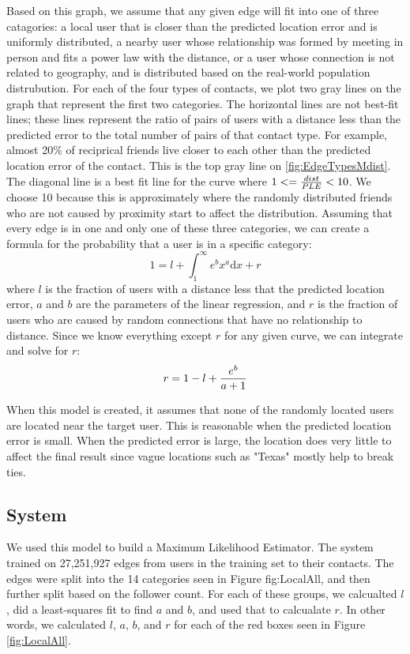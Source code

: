 \documentclass{sig-alternate}
\begin{document}
Based on this graph, we assume that any given edge will fit into one of three catagories: a local user that is closer than the predicted location error and is uniformly distributed, a nearby user whose relationship was formed by meeting in person and fits a power law with the distance, or a user whose connection is not related to geography, and is distributed based on the real-world population distrubution.
For each of the four types of contacts, we plot two gray lines on the graph that represent the first two categories.
The horizontal lines are not best-fit lines; these lines represent the ratio of pairs of users with a distance less than the predicted error to the total number of pairs of that contact type. 
For example, almost 20\% of reciprical friends live closer to each other than
the predicted location error of the contact. This is the top gray line on
\ref{fig:EdgeTypesMdist}.
The diagonal line is a best fit line for the curve where
\begin{math}1<={dist \over PLE}<10\end{math}.
We choose 10 because this is approximately where the randomly distributed friends who are not caused by proximity start to affect the distribution.
Assuming that every edge is in one and only one of these three categories, we can create a formula for the probability that a user is in a specific category:
\begin{displaymath}1=l+\int_{1}^{\infty}e^{b}x^{a}\mathrm{d}x+r\end{displaymath}
where \(l\) is the fraction of users with a distance less that the predicted
location error, \(a\) and \(b\) are the parameters of the linear regression,
and \(r\) is the fraction of users who are caused by random connections that
have no relationship to distance. Since we know everything except \(r\) for any given curve, we can integrate and solve for \(r\):
\begin{displaymath}r=1-l+{e^{b} \over a+1}\end{displaymath}

When this model is created, it assumes that none of the randomly located users are located near the target user. This is reasonable when the predicted location error is small. When the predicted error is large, the location does very little to affect the final result since vague locations such as "Texas" mostly help to break ties.

\subsection{System}
We used this model to build a Maximum Likelihood Estimator.
The system trained on 27,251,927 edges from users in the training set to their contacts.
The edges were split into the 14 categories seen in Figure {fig:LocalAll}, and then further split based on the follower count. For each of these groups, we calcualted \(l\), did a least-squares fit to find \(a\) and \(b\), and used that to calcualate \(r\).
In other words, we calculated \(l\), \(a\), \(b\), and \(r\) for each of the red boxes seen in Figure \ref{fig:LocalAll}.
\end{document}
